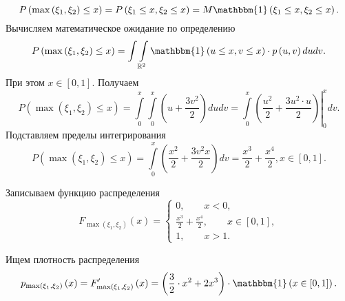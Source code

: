 \begin{enumerate}[label=\alph*)]
$$P \left( \max \left( \xi_1, \xi_2 \right) \leq x \right) =
P \left( \xi_1 \leq x, \xi_2 \leq x \right) =
M \mathbbm{1} \left( \xi_1 \leq x, \xi_2 \leq x \right).$$
Вычисляем математическое ожидание по определению
$$P \left( \max \left( \xi_1, \xi_2 \right) \leq x \right) =
\int \int \limits_{ \mathbb{R}^2} \mathbbm{1} \left( u \leq x, v \leq x \right) \cdot p \left( u, v \right) dudv.$$
При этом $x \in \left[ 0, 1 \right] $.
Получаем
$$P \left( \max \left( \xi_1, \xi_2 \right) \leq x \right) =
\int \limits_0^x \int \limits_0^x \left( u + \frac{3v^2}{2} \right) dudv =
\left. \int \limits_0^x \left( \frac{u^2}{2} + \frac{3u^2 \cdot u}{2} \right) \right|_0^x dv.$$
Подставляем пределы интегрирования
$$P \left( \max \left( \xi_1, \xi_2 \right) \leq x \right) =
\int \limits_0^x \left( \frac{x^2}{2} + \frac{3v^2 x}{2} \right) dv =
\frac{x^3}{2} + \frac{x^4}{2}, x \in \left[ 0, 1 \right].$$

Записываем функцию распределения
$$F_{ \max \left( \xi_1, \xi_2 \right) } \left( x \right) =
\begin{cases}
0, \qquad x < 0, \\
\frac{x^3}{2} + \frac{x^4}{2}, \qquad x \in \left[ 0, 1 \right], \\
1, \qquad x > 1.
\end{cases}$$

Ищем плотность распределения
$$p_{ \max \left( \xi_1, \xi_2 \right) } \left( x \right) =
F_{ \max \left( \xi_1, \xi_2 \right) }' \left( x \right) =
\left( \frac{3}{2} \cdot x^2 + 2x^3 \right) \cdot \mathbbm{1} \left( x \in \left[ 0, 1 \right] \right).$$
\end{enumerate}
